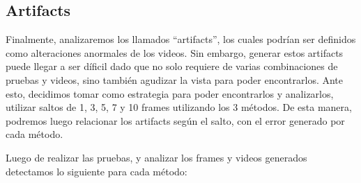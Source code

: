 \subsection{Artifacts}

Finalmente, analizaremos los llamados ``artifacts'', los cuales podr\'ian ser definidos como alteraciones anormales de los videos. Sin embargo, generar estos artifacts puede llegar a ser d\'ificil dado que no solo requiere de varias combinaciones de pruebas y videos, sino tambi\'en agudizar la vista para poder encontrarlos. Ante esto, decidimos tomar como estrategia para poder encontrarlos y analizarlos, utilizar saltos de 1, 3, 5, 7 y 10 frames utilizando los 3 m\'etodos. De esta manera, podremos luego relacionar los artifacts seg\'un el salto, con el error generado por cada m\'etodo.

Luego de realizar las pruebas, y analizar los frames y videos generados detectamos lo siguiente para cada m\'etodo:

